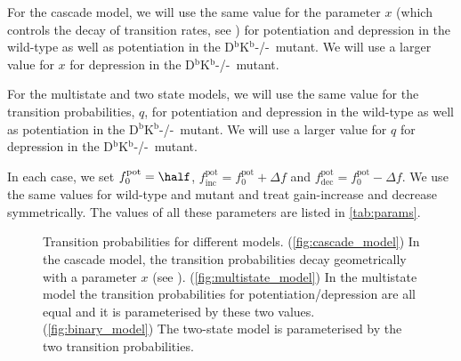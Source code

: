 \documentclass[12pt]{article}
\newcommand{\pot}{^{\text{pot}}}
\newcommand{\norm}{_0}
\newcommand{\inc}{_{\text{inc}}}
\newcommand{\dec}{_{\text{dec}}}
\newcommand{\KO}{D$^\mathrm{b}$K$^\mathrm{b}$-/-}
\begin{document}
For the cascade model, we will use the same value for the parameter $x$ (which controls the decay of transition rates, see \cite{Fusi2005cascade}) for potentiation and depression in the wild-type as well as potentiation in the \KO\ mutant.
We will use a larger value for $x$ for depression in the \KO\ mutant.

For the multistate and two state models, we will use the same value for the transition probabilities, $q$, for potentiation and depression in the wild-type as well as potentiation in the \KO\ mutant.
We will use a larger value for $q$ for depression in the \KO\ mutant.

In each case, we set $f\pot\norm=\half$, $f\pot\inc=f\pot\norm+\Delta f$ and $f\pot\dec=f\pot\norm-\Delta f$.
We use the same values for wild-type and mutant and treat gain-increase and decrease symmetrically.
The values of all these parameters are listed in \autoref{tab:params}.

\begin{figure}
 \begin{center}
 \begin{myenuma}
  \item{}\label{fig:cascade_model}\hspace{0.5cm}
  \item{}\label{fig:multistate_model}\hspace{0.5cm}
  \item{}\label{fig:binary_model}
 \end{myenuma}
 \end{center}
  \caption{Transition probabilities for different models.
  (\ref{fig:cascade_model}) In the cascade model, the transition probabilities decay geometrically with a parameter $x$ (see \cite{Fusi2005cascade}).
  (\ref{fig:multistate_model}) In the multistate model the transition probabilities for potentiation/depression are all equal and it is parameterised by these two values.
  (\ref{fig:binary_model}) The two-state model is parameterised by the two transition probabilities.} \label{fig:models}
\end{figure}
\end{document}
